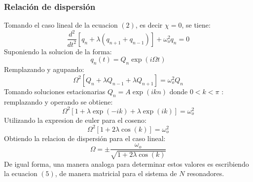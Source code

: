 \documentclass[11pt,letterpaper,twocolumn]{article}
\begin{document}
\subsubsection*{Relación de dispersión}
Tomando el caso lineal de la ecuacion $(2)$, es decir $\chi=0$, se tiene:
\begin{equation}
\dfrac{d^{2}}{dt^{2}} \left[ q_{n} + \lambda \left( q_{n+1} + q_{n-1}\right) \right] + \omega_{o}^{2} q_{n} = 0 
\end{equation}
Suponiendo la solucion de la forma: 
$$q_{n}(t)=Q_{n} \exp(i \Omega t)$$
Remplazando y agupando: 
\begin{equation}
\Omega^{2} \left[ Q_{n} + \lambda Q_{n-1} + \lambda Q_{n+1}\right]=\omega_{o}^{2}Q_{n}
\end{equation}
Tomando soluciones estacionarias $Q_{n}=A\exp(ikn)$ donde $0<k<\pi$ : 
remplazando y operando se obtiene: 
$$\Omega^{2} \left[ 1 + \lambda \exp(-ik)+\lambda \exp(ik) \right] = \omega_{o}^{2}$$
Utilizando la expresion de euler para el coseno: 
$$\Omega^{2} \left[ 1 + 2 \lambda \cos(k) \right] = \omega_{o}^{2} $$
Obtiendo la relacion de dispersión para el caso lineal:  
\begin{equation}
\Omega= \pm \dfrac{\omega_{o}}{\sqrt{1 + 2 \lambda \cos(k)}}
\end{equation}
De igual forma, una manera analoga para determinar estos valores es escribiendo la ecuacion $(5)$, de manera matricial para el sistema de $N$ resonadores. 
\end{document}

